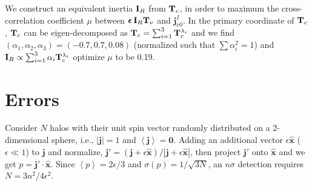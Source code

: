 \documentclass[aps,prd,twocolumn,amsmath,amssymb,amsfont,superscriptaddress,nofootinbib]{revtex4-1}
\newcommand{\bs}{\boldsymbol}
\newcommand{\T}{\bold{T}}
\newcommand{\I}{\bold{I}}
\newcommand{\spin}{\bs{j}}
\begin{document}
We construct an equivalent inertia $\I_R$ from $\T_c$, in order to maximum the cross-correlation coefficient $\mu$ between $\bs{\epsilon}\,\I_R\T_\nu$ and $\spin^I_{\nu 0}$.
In the primary coordinate of $\T_c$, $\T_c$ can be eigen-decomposed as $\T_c=\sum_{i=1}^3\T^{\lambda_i}_c$ and we find $(\alpha_1,\alpha_2,\alpha_3)=(-0.7,0.7,0.08)$ (normalized such that $\sum \alpha_i^2=1$) and $\I_R\propto\sum_{i=1}^3\alpha_i\T^{\lambda_i}_c$
optimize $\mu$ to be 0.19.


\section{Errors}\label{app.error}
Consider $N$ halos with their unit spin vector randomly distributed on a 2-dimensional sphere, i.e., $|\spin|=1$ and $\left\langle \spin \right\rangle =\bs{0}$. Adding an additional vector $\epsilon\hat{\bs{x}}$ ($\epsilon\ll 1$) to $\spin$ and normalize, $\spin'=(\spin+\epsilon\hat{\bs{x}})/|\spin+\epsilon\hat{\bs{x}}|$, then project $\spin'$ onto $\hat{\bs{x}}$ and we get $p=\spin'\cdot\hat{\bs{x}}$. Since $\left\langle p \right\rangle=2\epsilon/3$ and $\sigma(p)=1/\sqrt{3N}$, an $n\sigma$ detection requires $N=3n^2/4\epsilon^2$.





\end{document}
